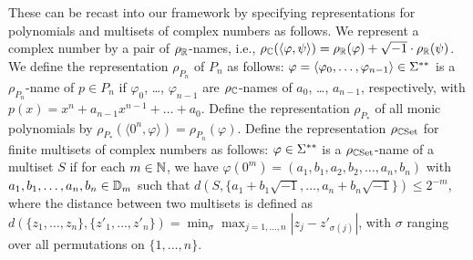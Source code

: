 \documentclass[a4paper,UKenglish]{lipics}
\begin{document}

These can be recast into our framework by specifying 
representations for polynomials and multisets of complex numbers as follows.
We represent a complex number by a pair of $\rho _\mathbb R$-names,
i.e., $
 \rho_\mathbb C (\langle \varphi, \psi \rangle) 
= 
 \rho _\mathbb R (\varphi) + \sqrt{-1} \cdot \rho _\mathbb R (\psi)
$.  We define the representation $\rho_{P_n}$ of 
$P _n$ as follows: 
$\varphi = \langle \varphi _0, \ldots, \varphi _{n - 1} \rangle \in \Sigma ^{**}$ 
is a $\rho_{P_n}$-name of $p \in P_n$ if 
$\varphi _0$, \ldots, $\varphi _{n - 1}$ are 
$\rho_{\mathbb C}$-names of $a _0$, \ldots, $a _{n - 1}$, respectively, 
with $p(x) = x^n + a_{n-1}x^{n-1} + \dots + a_0$.
Define the representation $\rho_{P_*}$ of all monic polynomials by
$\rho_{P_*}(\langle 0^n, \varphi \rangle) = \rho_{P_n}(\varphi)$.
Define the representation $\rho_{\mathbb C\mathrm{Set}}$ for finite multisets of complex numbers 
as follows:
$\varphi \in \Sigma ^{**}$ is a $\rho_{\mathbb C\mathrm{Set}}$-name of a multiset $S$ if 
for each $m \in \mathbb N$, 
we have $\varphi(0 ^m) = ( a_1, b_1, a_2, b_2, \dots, a_n, b_n )$
with $a_1, b_1, \dots, a_n, b_n \in \mathbb D_m$
such that 
$d(S, \{a_1 + b_1 \sqrt{-1}, \dots, a_n + b_n \sqrt{-1}\}) \le 2^{-m}$, 
where the distance between two multisets is defined as $
 d (\{z_1, \dots, z_n\}, \{z'_1, \dots, z'_n\}) 
= 
 \min_{\sigma} \max_{j = 1, \ldots, n}|z_j - z'_{\sigma(j)}|
$, with $\sigma$ ranging over all permutations on $\{1, \ldots, n\}$. 

\end{document}
